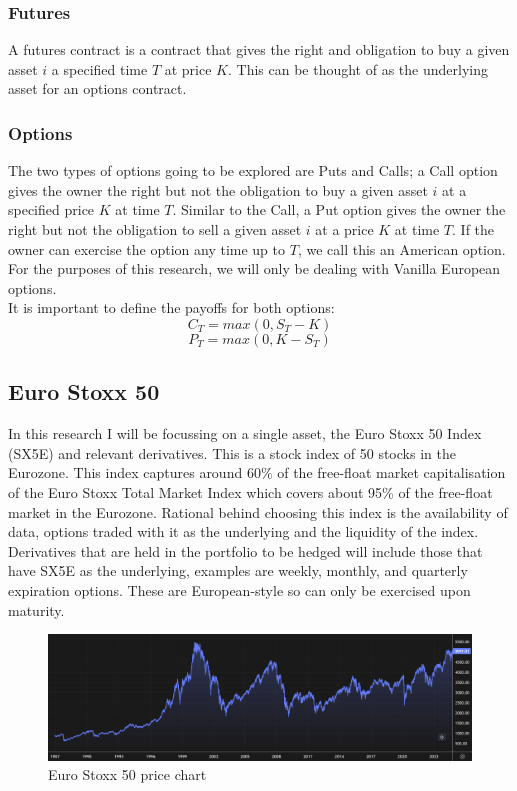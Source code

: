 \documentclass[12pt]{article}
\numberwithin{equation}{section}
\begin{document}
\subsubsection{Futures}
A futures contract is a contract that gives the right and obligation to buy a 
given asset $i$ a specified time $T$ at price $K$. This can be thought of as the 
underlying asset for an options contract. 
\subsubsection{Options}
The two types of options going to be explored are Puts and Calls; a Call option 
gives the owner the right but not the obligation to buy a given asset $i$ at 
a specified price $K$ at time $T$. Similar to the Call, a Put option gives the 
owner the right but not the obligation to sell a given asset $i$ at a price $K$ 
at time $T$. If the owner can exercise the option any time up to $T$, we call 
this an American option. For the purposes of this research, we will only be 
dealing with Vanilla European options.\\ 
It is important to define the payoffs for both options: 
\begin{equation}
C_T = max(0,S_T-K)
\end{equation}
\begin{equation}
P_T = max(0,K-S_T)
\end{equation}



\subsection{Euro Stoxx 50}
In this research I will be focussing on a single asset, the Euro Stoxx 50 Index
(SX5E) and relevant derivatives. This is a stock index of 50 stocks in the Eurozone. 
This index captures around 60\% of the free-float market capitalisation of the 
Euro Stoxx Total Market Index which covers about 95\% of the free-float market 
in the Eurozone. Rational behind choosing this index is the availability of data,
options traded with it as the underlying and the liquidity of the index.\\
Derivatives that are held in the portfolio to be hedged will include those that 
have SX5E as the underlying, examples are weekly, monthly, and quarterly
expiration options. These are European-style so can only be exercised upon 
maturity. 
\begin{figure}[h]
    \centering
    \includegraphics[scale=0.35]{sx5e.png}
    \caption{Euro Stoxx 50 price chart}
\end{figure}
\end{document}
